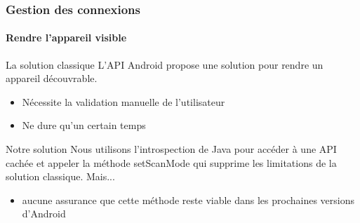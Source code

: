 \documentclass{beamer}
\begin{document}
    \begin{frame}
      \frametitle{Gestion des connexions}
      \framesubtitle{Rendre l'appareil visible}
      \begin{block}{La solution classique}
        L'API Android propose une solution pour rendre un appareil découvrable.
        \begin{itemize}
          \item Nécessite la validation manuelle de l'utilisateur
          \item Ne dure qu'un certain temps
        \end{itemize}
      \end{block}
      \begin{block}{Notre solution}
        Nous utilisons l'introspection de Java pour accéder à une API cachée et appeler la méthode setScanMode qui supprime les limitations de la solution classique. Mais...
        \begin{itemize}
          \item aucune assurance que cette méthode reste viable dans les prochaines versions d'Android
        \end{itemize}
      \end{block}
    \end{frame}
\end{document}
